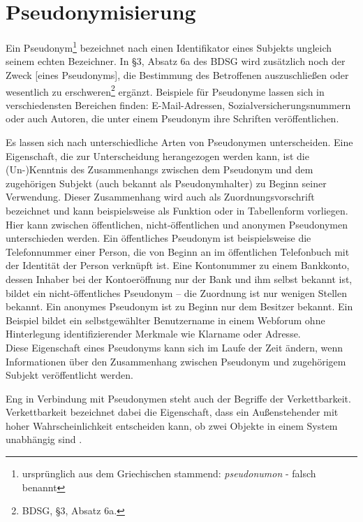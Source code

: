 \section{Pseudonymisierung}

\label{sec_basics_pseudonymity}

Ein Pseudonym\footnote{
	ursprünglich aus dem Griechischen stammend: \textit{pseudonumon} - falsch benannt
} bezeichnet nach \cite{pfitzmann2010} einen Identifikator eines Subjekts ungleich seinem echten Bezeichner. In §3, Absatz 6a des BDSG wird zusätzlich noch der \glqq Zweck [eines Pseudonyms], die Bestimmung des Betroffenen auszuschließen oder wesentlich zu erschweren\grqq{}\footnote{
  BDSG, §3, Absatz 6a.
} ergänzt. Beispiele für Pseudonyme lassen sich in verschiedensten Bereichen finden: E-Mail-Adressen, Sozialversicherungsnummern oder auch Autoren, die unter einem Pseudonym ihre Schriften veröffentlichen.

Es lassen sich nach \cite{pfitzmann1990} unterschiedliche Arten von Pseudonymen unterscheiden. Eine Eigenschaft, die zur Unterscheidung herangezogen werden kann, ist die (Un-)Kenntnis des Zusammenhangs zwischen dem Pseudonym und dem zugehörigen Subjekt (auch bekannt als Pseudonymhalter) zu Beginn seiner Verwendung. Dieser Zusammenhang wird auch als Zuordnungsvorschrift bezeichnet und kann beispielsweise als Funktion oder in Tabellenform vorliegen.\\
Hier kann zwischen öffentlichen, nicht-öffentlichen und anonymen Pseudonymen unterschieden werden. Ein öffentliches Pseudonym ist beispielsweise die Telefonnummer einer Person, die von Beginn an im öffentlichen Telefonbuch mit der Identität der Person verknüpft ist. Eine Kontonummer zu einem Bankkonto, dessen Inhaber bei der Kontoeröffnung nur der Bank und ihm selbst bekannt ist, bildet ein nicht-öffentliches Pseudonym -- die Zuordnung ist nur wenigen Stellen bekannt. Ein anonymes Pseudonym ist zu Beginn nur dem Besitzer bekannt. Ein Beispiel bildet ein selbstgewählter Benutzername in einem Webforum ohne Hinterlegung identifizierender Merkmale wie Klarname oder Adresse.\\
Diese Eigenschaft eines Pseudonyms kann sich im Laufe der Zeit ändern, wenn Informationen über den Zusammenhang zwischen Pseudonym und zugehörigem Subjekt veröffentlicht werden.

Eng in Verbindung mit Pseudonymen steht auch der Begriffe der Verkettbarkeit. 
Verkettbarkeit bezeichnet dabei die Eigenschaft, dass ein Außenstehender mit hoher Wahrscheinlichkeit entscheiden kann, ob zwei Objekte in einem System unabhängig sind \cite{pfitzmann2010}.

